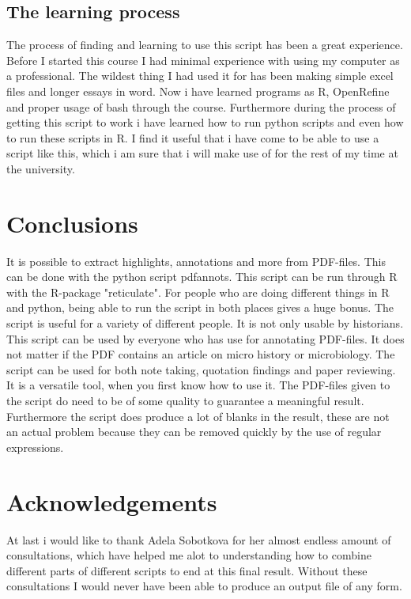 \documentclass{article}
\begin{document}
\subsection{The learning process}
The process of finding and learning to use this script has been a great experience. Before I started this course I had minimal experience with using my computer as a professional. The wildest thing I had used it for has been making simple excel files and longer essays in word. Now i have learned programs as R, OpenRefine and proper usage of bash through the course. Furthermore during the process of getting this script to work i have learned how to run python scripts and even how to run these scripts in R. I find it useful that i have come to be able to use a script like this, which i am sure that i will make use of for the rest of my time at the university.

\section{Conclusions}
It is possible to extract highlights, annotations and more from PDF-files. This can be done with the python script pdfannots. This script can be run through R with the R-package "reticulate". For people who are doing different things in R and python, being able to run the script in both places gives a huge bonus. The script is useful for a variety of different people. It is not only usable by historians. This script can be used by everyone who has use for annotating PDF-files. It does not matter if the PDF contains an article on micro history or microbiology. The script can be used for both note taking, quotation findings and paper reviewing. It is a versatile tool, when you first know how to use it. The PDF-files given to the script do need to be of some quality to guarantee a meaningful result. Furthermore the script does produce a lot of blanks in the result, these are not an actual problem because they can be removed quickly by the use of regular expressions. 

\section{Acknowledgements}
At last i would like to thank Adela Sobotkova for her almost endless amount of consultations, which have helped me alot to understanding how to combine different parts of different scripts to end at this final result. Without these consultations I would never have been able to  produce an output file of any form. 
\end{document}
